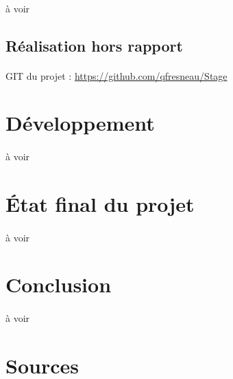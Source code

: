 \documentclass[a4paper,12pt]{extarticle}
\begin{document}
\paragraph{}
à voir\\

\subsection{Réalisation hors rapport}

\paragraph{}
GIT du projet :
\url{https://github.com/qfresneau/Stage}\\

\clearpage

\section{Développement}

\paragraph{}
à voir\\

\clearpage

\section{État final du projet}

\paragraph{}
à voir\\

\clearpage

\section{Conclusion}

\paragraph{}
à voir\\

\clearpage

\section{Sources}
\end{document}
